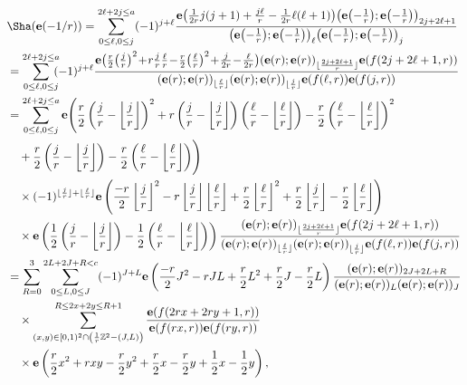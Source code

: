 \documentclass[pdftex]{sigma}
\numberwithin{equation}{section}
\def\BZ{\mathbb{Z}}
\def\e{\mathbf e}
\def\WRT{\Sha}
\def\BZ{\mathbb Z}
\begin{document}
\begin{align*}
 &\WRT(\e(-1/r))
 =\sum_{0\leq\ell,0\leq j}^{2\ell+2j\leq a}(-1)^{j+\ell}
 \frac{\e\bigl(\frac{1}{2r}j(j+1)+\frac{j\ell}{r}-\frac{1}{2r}\ell(\ell+1)\bigr)
 \bigl(\e\bigl(-\frac{1}{r}\bigr);\e\bigl(-\frac{1}{r}\bigr)\bigr)_{2j+2\ell+1}}
 {\bigl(\e\bigl(-\frac{1}{r}\bigr);\e\bigl(-\frac{1}{r}\bigr)\bigr)_{\ell}\bigl(\e\bigl(-\frac{1}{r}\bigr);\e\bigl(-\frac{1}{r}\bigr)\bigr)_{j}}\\
 & =\sum_{0\leq\ell,0\leq j}^{2\ell+2j\leq a} \!\!\!(-1)^{j+\ell}
 \frac{\e\bigl(\frac{r}{2}\bigl(\frac{j}{r}\bigr)^2\!+\!r\frac{j}{r}\frac{\ell}{r}\!-\!\frac{r}{2}\bigl(\frac{\ell}{r}\bigr)^2\!+\!\frac{j}{2r}\!-\!\frac{\ell}{2r}\bigr)
 (\e(r);\e(r))_{\lfloor\frac{2j+2\ell+1}{r}\rfloor}
 \e(f(2j+2\ell+1,r))}
 {(\e(r);\e(r))_{\lfloor\frac{\ell}{r}\rfloor}(\e(r);\e(r))_{\lfloor\frac{ j}{r}\rfloor}
 \e(f(\ell,r))\e(f(j,r))}\\
 & =\sum_{0\leq\ell,0\leq j}^{2\ell+2j\leq a}
 \e\Biggl(\frac{r}{2}\left(\frac{j}{r}-\left\lfloor \frac{j}{r}\right\rfloor\right)^2+r\left(\frac{j}{r}-\left\lfloor \frac{j}{r}\right\rfloor\right)\left(\frac{\ell}{r}-\left\lfloor \frac{\ell}{r}\right\rfloor\right)-\frac{r}{2}\left(\frac{\ell}{r}-\left\lfloor \frac{\ell}{r}\right\rfloor\right)^2\\
& \quad{}+\frac{r}{2}\left(\frac{j}{r}-\left\lfloor\frac{j}{r}\right\rfloor\right)
 -\frac{r}{2}\left(\frac{\ell}{r}-\left\lfloor\frac{\ell}{r}\right\rfloor\right)\Biggr)\\
 &\quad{}\times(-1)^{\lfloor\frac{j}{r}\rfloor+\lfloor\frac{\ell}{r}\rfloor}\e\left(\frac{-r}{2}\left\lfloor\frac{j}{r}\right\rfloor^2-r\left\lfloor \frac{j}{r}\right\rfloor\left\lfloor\frac{\ell}{r}\right\rfloor+\frac{r}{2}\left\lfloor\frac{\ell}{r}\right\rfloor^2+\frac{r}{2}\left\lfloor\frac{j}{r}\right\rfloor-\frac{r}{2}\left\lfloor\frac{\ell}{r}\right\rfloor\right)\\
 &\quad{}\times \e\left(\frac{1}{2}\left(\frac{j}{r}-\left\lfloor\frac{j}{r}\right\rfloor\right)-\frac{1}{2}\left(\frac{\ell}{r}-\left\lfloor\frac{\ell}{r}\right\rfloor\right)\right)
 \frac{(\e(r);\e(r))_{\lfloor\frac{2j+2\ell+1}{r}\rfloor}
 \e(f(2j+2\ell+1,r))}
 {(\e(r);\e(r))_{\lfloor\frac{\ell}{r}\rfloor}(\e(r);\e(r))_{\lfloor\frac{ j}{r}\rfloor}
 \e(f(\ell,r))\e(f(j,r))}\\
 & =\sum_{R=0}^{3}\sum_{0\leq L,0\leq J}^{2L+2J+R<c}(-1)^{J+L}\e\left(\frac{-r}{2}J^2-rJL+\frac{r}{2}L^2+\frac{r}{2}J-\frac{r}{2}L\right) \frac{(\e(r);\e(r))_{2J+2L+R}}{(\e(r);\e(r))_{L}(\e(r);\e(r))_{J}}\\
 &\quad{}\times\sum_{(x,y)\in[0,1)^2\cap\left(\frac{1}{r}\BZ^2-(J,L)\right)}^{R\leq2x+2y\leq R+1}
 \frac{\e(f(2rx+2ry+1,r))}{\e(f(rx,r))\e(f(ry,r))}\\
 &\quad{}\times \e\left(\frac{r}{2}x^2+rxy-\frac{r}{2}y^2+\frac{r}{2}x-\frac{r}{2}y+\frac{1}{2}x-\frac{1}{2}y\right),
\end{align*}
\end{document}
